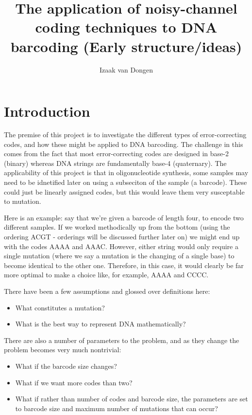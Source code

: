 \documentclass{article}
\title{The application of noisy-channel coding techniques to DNA barcoding (Early structure/ideas)}
\author{Izaak van Dongen}
\begin{document}
    \maketitle
    \tableofcontents
    \lstlistoflistings

    \section{Introduction}
    The premise of this project is to investigate the different types of
    error-correcting codes, and how these might be applied to DNA barcoding.
    The challenge in this comes from the fact that most error-correcting codes
    are designed in base-2 (binary) whereas DNA strings are fundamentally
    base-4 (quaternary). The applicability of this project is that in
    oligonucleotide synthesis, some samples may need to be idnetified later on
    using a subseciton of the sample (a barcode). These could just be linearly
    assigned codes, but this would leave them very susceptable to mutation.

    Here is an example: say that we're given a barcode of length four, to
    encode two different samples. If we worked methodically up from the bottom
    (using the ordering ACGT - orderings will be discussed further later on) we
    might end up with the codes AAAA and AAAC. However, either string would
    only require a single mutation (where we say a mutation is the changing of
    a single base) to become identical to the other one. Therefore, in this
    case, it would clearly be far more optimal to make a choice like, for
    example, AAAA and CCCC.

    There have been a few assumptions and glossed over definitions here:

    \begin{itemize}
        \item What constitutes a mutation?
        \item What is the best way to represent DNA mathematically?
    \end{itemize}

    There are also a number of parameters to the problem, and as they change
    the problem becomes very much nontrivial:

    \begin{itemize}
    \item What if the barcode size changes?
    \item What if we want more codes than two?
    \item What if rather than number of codes and barcode size, the parameters
          are set to barcode size and maximum number of mutations that can
          occur?
    \end{itemize}
    
\end{document}
